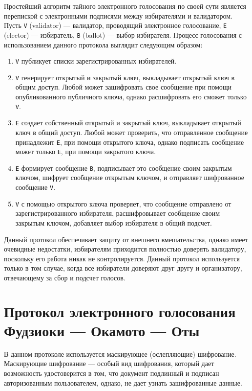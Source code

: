 Простейший алгоритм тайного электронного голосования по своей сути является перепиской с электронными подписями между избирателями и валидатором. Пусть \verb|V| (validator) — валидатор, проводящий электронное голосование, \verb|E| (elector) — избиратель, \verb|B| (ballot) — выбор избирателя. Процесс голосования с использованием данного протокола выглядит следующим образом:

\begin{enumerate} 
  \item \verb|V| публикует списки зарегистрированных избирателей.
  
  \item \verb|V| генерирует открытый и закрытый ключ, выкладывает открытый ключ в общим доступ. Любой может зашифровать свое сообщение при помощи опубликованного публичного ключа, однако расшифровать его сможет только \verb|V|.
  
  \item \verb|E| создает собственный открытый и закрытый ключ, выкладывает открытый ключ в общий доступ. Любой может проверить, что отправленное сообщение принадлежит \verb|E|, при помощи открытого ключа, однако подписать сообщение может только \verb|E|, при помощи закрытого ключа.
  
  \item \verb|E| формирует сообщение \verb|B|, подписывает это сообщение своим закрытым ключом, шифрует сообщение открытым ключом, и отправляет шифрованное сообщение \verb|V|.
  
  \item \verb|V| с помощью открытого ключа проверяет, что сообщение отправлено от зарегистрированного избирателя, расшифровывает сообщение своим закрытым ключом, добавляет выбор избирателя в общий подсчет.
\end{enumerate}

Данный протокол обеспечивает защиту от внешнего вмешательства, однако имеет очевидные недостатки, избирателям приходится полностью доверять валидатору, поскольку его работа никак не контролируется. Данный протокол используется только в том случае, когда все избиратели доверяют друг другу и организатору, отвечающему за сбор и подсчет голосов.

\section{Протокол электронного голосования Фудзиоки — Окамото — Оты}

В данном протоколе используется маскирующее (ослепляющие) шифрование. Маскирующие шифрование — особый вид шифрования, который дает возможность удостоверится в том, что документ подлинный и подписан авторизованным пользователем, однако, не дает узнать зашифрованные данные.

